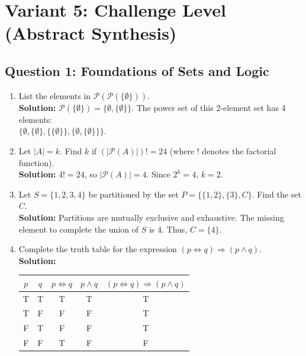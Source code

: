 \documentclass[11pt]{article}
\begin{document}
\newpage
\section{Variant 5: Challenge Level (Abstract Synthesis)}

\subsection*{Question 1: Foundations of Sets and Logic}
\begin{enumerate}[label=(\roman*)]
    \item List the elements in $\mathcal{P}(\mathcal{P}(\{\emptyset\}))$.\\
    \textbf{Solution:} $\mathcal{P}(\{\emptyset\}) = \{\emptyset, \{\emptyset\}\}$. The power set of this 2-element set has 4 elements: \\
    $\{\emptyset, \{\emptyset\}, \{\{\emptyset\}\}, \{\emptyset, \{\emptyset\}\}\}$.

    \item Let $|A| = k$. Find $k$ if $(|\mathcal{P}(A)|)! = 24$ (where $!$ denotes the factorial function).\\
    \textbf{Solution:} $4! = 24$, so $|\mathcal{P}(A)| = 4$. Since $2^k = 4$, $k = 2$.

    \item Let $S = \{1, 2, 3, 4\}$ be partitioned by the set $P = \{\{1, 2\}, \{3\}, C\}$. Find the set $C$.\\
    \textbf{Solution:} Partitions are mutually exclusive and exhaustive. The missing element to complete the union of $S$ is 4. Thus, $C = \{4\}$.

    \item Complete the truth table for the expression $(p \Leftrightarrow q) \Rightarrow (p \wedge q)$.\\
    \textbf{Solution:}
    \begin{center}
    \begin{tabular}{|c|c|c|c|c|}
    \hline
    $p$ & $q$ & $p \Leftrightarrow q$ & $p \wedge q$ & $(p \Leftrightarrow q) \Rightarrow (p \wedge q)$ \\
    \hline
    T & T & T & T & T \\
    T & F & F & F & T \\
    F & T & F & F & T \\
    F & F & T & F & F \\
    \hline
    \end{tabular}
    \end{center}


\end{enumerate}
\end{document}

